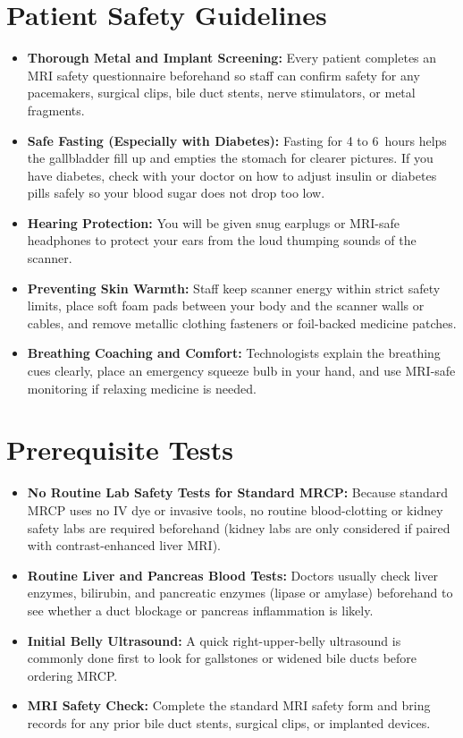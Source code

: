 \section{Patient Safety Guidelines}
\begin{itemize}
\item \textbf{Thorough Metal and Implant Screening:} Every patient completes an MRI safety questionnaire beforehand so staff can confirm safety for any pacemakers, surgical clips, bile duct stents, nerve stimulators, or metal fragments.
\item \textbf{Safe Fasting (Especially with Diabetes):} Fasting for 4 to 6~hours helps the gallbladder fill up and empties the stomach for clearer pictures. If you have diabetes, check with your doctor on how to adjust insulin or diabetes pills safely so your blood sugar does not drop too low.
\item \textbf{Hearing Protection:} You will be given snug earplugs or MRI-safe headphones to protect your ears from the loud thumping sounds of the scanner.
\item \textbf{Preventing Skin Warmth:} Staff keep scanner energy within strict safety limits, place soft foam pads between your body and the scanner walls or cables, and remove metallic clothing fasteners or foil-backed medicine patches.
\item \textbf{Breathing Coaching and Comfort:} Technologists explain the breathing cues clearly, place an emergency squeeze bulb in your hand, and use MRI-safe monitoring if relaxing medicine is needed.
\end{itemize}

\section{Prerequisite Tests}
\begin{itemize}
\item \textbf{No Routine Lab Safety Tests for Standard MRCP:} Because standard MRCP uses no IV dye or invasive tools, no routine blood-clotting or kidney safety labs are required beforehand (kidney labs are only considered if paired with contrast-enhanced liver MRI).
\item \textbf{Routine Liver and Pancreas Blood Tests:} Doctors usually check liver enzymes, bilirubin, and pancreatic enzymes (lipase or amylase) beforehand to see whether a duct blockage or pancreas inflammation is likely.
\item \textbf{Initial Belly Ultrasound:} A quick right-upper-belly ultrasound is commonly done first to look for gallstones or widened bile ducts before ordering MRCP.
\item \textbf{MRI Safety Check:} Complete the standard MRI safety form and bring records for any prior bile duct stents, surgical clips, or implanted devices.
\end{itemize}

